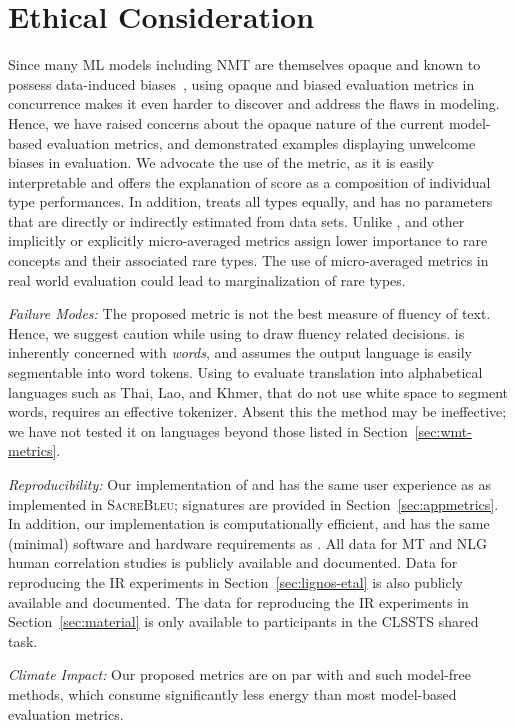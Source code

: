 \section*{Ethical Consideration}
Since many ML models including NMT are themselves opaque and known to possess data-induced biases~\cite{prates2019-mt-bias}, using opaque and biased evaluation metrics in concurrence makes it even harder to discover and address the flaws in modeling.
Hence, we have raised concerns about the opaque nature of the current model-based evaluation metrics, and demonstrated examples displaying unwelcome biases in evaluation. We advocate the use of the  metric, as it is easily interpretable and offers the explanation of score as a composition of individual type performances.
In addition,  treats all types equally, and has no parameters that are directly or indirectly estimated from data sets. Unlike ,  and other implicitly or explicitly micro-averaged metrics assign lower importance to rare concepts and their associated rare types. 
The use of micro-averaged metrics in real world evaluation could lead to marginalization of rare types.

\textit{Failure Modes:}
The proposed  metric is not the best measure of fluency of text. 
Hence, we suggest caution while using  to draw fluency related decisions.  is inherently concerned with \textit{words}, and assumes the output language is easily segmentable into word tokens. Using  to evaluate translation into alphabetical languages such as Thai, Lao, and Khmer, that do not use white space to segment words, requires an effective tokenizer. Absent this the method may be ineffective; we have not tested it on languages beyond those listed in Section~\ref{sec:wmt-metrics}.

\textit{Reproducibility:}
Our implementation of  and  has the same user experience as \bleu{} as implemented in \textsc{SacreBleu}; signatures are provided in Section~\ref{sec:appmetrics}. 
In addition, our implementation is  computationally efficient, and has the same (minimal) software and hardware requirements as \bleu{}. 
 All data for MT and NLG human correlation studies is publicly available and documented. Data for reproducing the IR experiments in Section~\ref{sec:lignos-etal} is also publicly available and documented. The data for reproducing the IR experiments in Section~\ref{sec:material} is only available to participants in the CLSSTS shared task. 

\textit{Climate Impact:} Our proposed metrics are on par with \bleu{} and such model-free methods, which consume significantly less energy than most model-based evaluation metrics.

